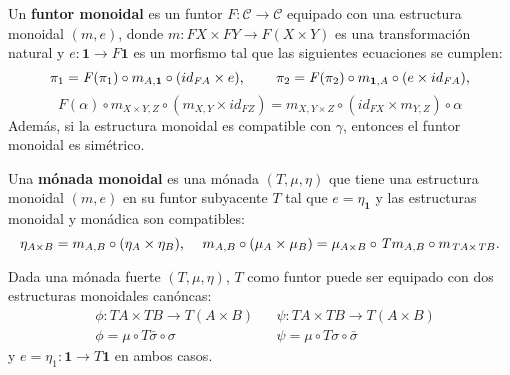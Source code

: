 \begin{definition}
Un \textbf{funtor monoidal} es un funtor $\mathit{F}: \mathscr{C} \rightarrow \mathscr{C}$ equipado con una estructura monoidal $(m,e)$, donde $m : \mathit{F} X \times \mathit{F} Y \rightarrow \mathit{F} (X \times Y)$ es una transformación natural y $e : \mathbf
{1} \rightarrow \mathit{F} \mathbf{1}$ es un morfismo tal que las siguientes ecuaciones se cumplen:
\begin{equation*}
\pi_1 = \mathit{F}(\pi_1) \circ m_{A,\mathbf{1}} \circ (id_{\mathit{F}A} \times e) \text{, \qquad} \pi_2 = \mathit{F}(\pi_2) \circ m_{\mathbf{1},A} \circ (e \times id_{\mathit{F}A}) \text{,}
\end{equation*}
\begin{equation*}
\mathit{F}(\alpha) \circ m_{X \times Y, Z} \circ (m_{X,Y} \times id_{\mathit{F}Z}) = m_{X, Y \times Z} \circ (id_{\mathit{F}X} \times m_{Y,Z}) \circ \alpha
\end{equation*}
Además, si la estructura monoidal es compatible con $\gamma$, entonces el funtor monoidal es simétrico.
\end{definition}

\begin{definition}
Una \textbf{mónada monoidal} es una mónada $(\textit{T},\mu,\eta)$ que tiene una estructura monoidal $(m,e)$ en su funtor subyacente $\mathit{T}$ tal que $e = \eta_{\mathbf{1}}$ y las estructuras monoidal y monádica son compatibles:
\begin{equation*}
\eta_{A \times B} = m_{A,B} \circ (\eta_A \times \eta_B) \text{, \quad} m_{A,B} \circ (\mu_A \times \mu_B) = \mu_{A \times B} \circ \mathit{T}m_{A,B} \circ m_{\mathit{T}A \times \mathit{T}B}.
\end{equation*}
\end{definition}

Dada una mónada fuerte $(\mathit{T},\mu,\eta)$, $\mathit{T}$ como funtor puede ser equipado con dos estructuras monoidales canóncas:
\begin{align*}
&\phi : \mathit{T}A \times \mathit{T}B \rightarrow \mathit{T} (A \times B) & &\psi : \mathit{T}A \times \mathit{T}B \rightarrow \mathit{T}(A \times B) \\
&\phi = \mu \circ \mathit{T}\bar{\sigma} \circ \sigma & &\psi = \mu \circ \mathit{T}\sigma \circ \bar{\sigma}
\end{align*}
y $e = \eta_1 : \mathbf{1} \rightarrow \mathit{T}\mathbf{1}$ en ambos casos. 


